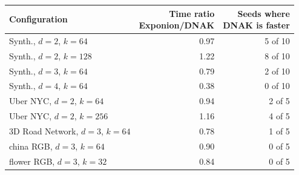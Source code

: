 \begin{tabular}{lrr}
\toprule
Configuration & \shortstack[r]{Time ratio\\ Exponion/DNAK} & \shortstack[r]{Seeds where\\ DNAK is faster} \\
\midrule
Synth., $d{=}2$, $k{=}64$ & 0.97 & 5 of 10 \\
Synth., $d{=}2$, $k{=}128$ & 1.22 & 8 of 10 \\
Synth., $d{=}3$, $k{=}64$ & 0.79 & 2 of 10 \\
Synth., $d{=}4$, $k{=}64$ & 0.38 & 0 of 10 \\
Uber NYC, $d{=}2$, $k{=}64$ & 0.94 & 2 of 5 \\
Uber NYC, $d{=}2$, $k{=}256$ & 1.16 & 4 of 5 \\
3D Road Network, $d{=}3$, $k{=}64$ & 0.78 & 1 of 5 \\
china RGB, $d{=}3$, $k{=}64$ & 0.90 & 0 of 5 \\
flower RGB, $d{=}3$, $k{=}32$ & 0.84 & 0 of 5 \\
\bottomrule
\end{tabular}
